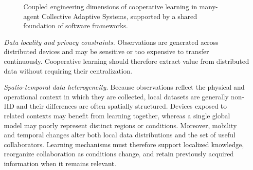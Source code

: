 \begin{figure}
{%
    }

    \endgroup
    \caption{Coupled engineering dimensions of cooperative learning
        in many-agent Collective Adaptive Systems,
        supported by a shared foundation of software frameworks.}
    \label{fig:overview}
\end{figure}

\emph{Data locality and privacy constraints.}
Observations are generated across distributed devices and may be sensitive 
 or too expensive to transfer continuously.
%
Cooperative learning should therefore extract value from distributed data 
 without requiring their centralization.

\emph{Spatio-temporal data heterogeneity.}
Because observations reflect the physical and operational context in which they are collected, 
 local datasets are generally non-\gls{IID} and their differences are often spatially structured.
%
Devices exposed to related contexts may benefit from learning together, 
 whereas a single global model may poorly represent distinct regions or conditions.
%
Moreover, 
 mobility and temporal changes alter both local data distributions 
 and the set of useful collaborators.
%
Learning mechanisms must therefore support localized knowledge, 
 reorganize collaboration as conditions change, 
 and retain previously acquired information when it remains relevant.


